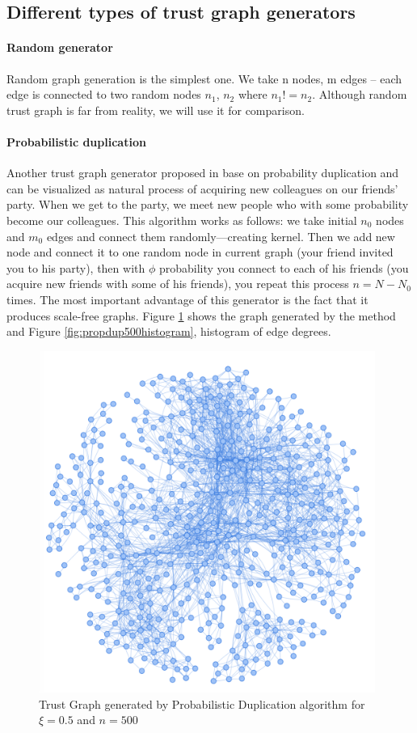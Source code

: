 \documentclass[nostrict]{szablonPG}
\begin{document}
\subsection{Different types of trust graph generators}
\paragraph{Random generator}
Random graph generation is the simplest one. We take n nodes, m edges -- each edge is connected to two random nodes $n_1$, $n_2$ where $n_1 != n_2$. Although random trust graph is far from reality, we will use it for comparison.

\paragraph{Probabilistic duplication}
Another trust graph generator proposed in \cite{konorski2019mitigating} base on probability duplication and can be visualized as natural process of acquiring new colleagues on our friends' party. When we get to the party, we meet new people who with some probability become our colleagues. This algorithm works as follows: we take initial $n_0$ nodes and $m_0$ edges and connect them randomly---creating kernel. Then we add new node and connect it to one random node in current graph (your friend invited you to his party), then with $\phi$ probability you connect to each of his friends (you acquire new friends with some of his friends), you repeat this process $n = N - N_0$ times. 
The most important advantage of this generator is the fact that it produces scale-free graphs. Figure \ref{fig:propdup500graph} shows the graph generated by the method and Figure \ref{fig:propdup500histogram}, histogram of edge degrees.

\begin{figure}[h!]
    \includegraphics[width=11cm]{img/propDup500Graph.png}
    \centering
    \caption{Trust Graph generated by Probabilistic Duplication algorithm for $\xi=0.5$ and $n = 500$}
    \label{fig:propdup500graph}
\end{figure}
\end{document}
